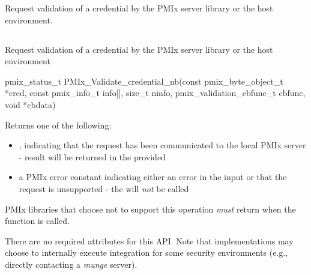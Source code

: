 \descr

Request validation of a credential by the \ac{PMIx} server library or the host environment.


\subsection{}

\summary

Request validation of a credential by the \ac{PMIx} server library or the host environment

\format

\cspecificstart
\begin{codepar}
pmix_status_t
PMIx_Validate_credential_nb(const pmix_byte_object_t *cred,
                            const pmix_info_t info[], size_t ninfo,
                            pmix_validation_cbfunc_t cbfunc,
                            void *cbdata)
\end{codepar}
\cspecificend

\begin{arglist}
\end{arglist}

Returns one of the following:

\begin{itemize}
    \item {}, indicating that the request has been communicated to the local \ac{PMIx} server - result will be returned in the provided 
    \item a \ac{PMIx} error constant indicating either an error in the input or that the request is unsupported - the  will \textit{not} be called
\end{itemize}

\reqattrstart
\ac{PMIx} libraries that choose not to support this operation \textit{must} return  when the function is called.

There are no required attributes for this \ac{API}. Note that implementations may choose to internally
execute integration for some security environments (e.g., directly
contacting a \textit{munge} server).

